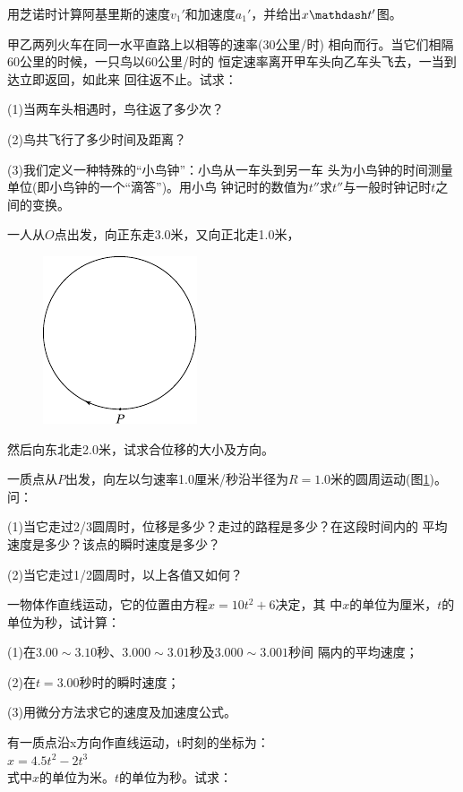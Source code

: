 \begin{exercises}

\exercise 用芝诺时计算阿基里斯的速度$v_1'$和加速度$a_1'$，并给出$x \mathdash t'$图。

\exercise 甲乙两列火车在同一水平直路上以相等的速率(30公里/时)
相向而行。当它们相隔60公里的时候，一只鸟以60公里/时的
恒定速率离开甲车头向乙车头飞去，一当到达立即返回，如此来
回往返不止。试求：

(1)当两车头相遇时，鸟往返了多少次？

(2)鸟共飞行了多少时间及距离？

(3)我们定义一种特殊的“小鸟钟”：小鸟从一车头到另一车
头为小鸟钟的时间测量单位(即小鸟钟的一个“滴答”)。用小鸟
钟记时的数值为$t''$求$t''$与一般时钟记时$t$之间的变换。

\exercise 一人从$O$点出发，向正东走3.0米，又向正北走1.0米，
\begin{figure}
    \begin{center}
        \includegraphics{figure/fig01.28}
        \caption{}
        \label{fig:01.28}
    \end{center}
\end{figure}
然后向东北走2.0米，试求合位移的大小及方向。

\exercise 一质点从$ P $出发，向左以匀速率1.0厘米/秒沿半径为$R=1.0$米的圆周运动(图\ref{fig:01.28})。问：

(1)当它走过2/3圆周时，位移是多少？走过的路程是多少？在这段时间内的
平均速度是多少？该点的瞬时速度是多少？

\clearpage
(2)当它走过1/2圆周时，以上各值又如何？

\exercise 一物体作直线运动，它的位置由方程$x=10t^2+6$决定，其
中$x$的单位为厘米，$t$的单位为秒，试计算：

(1)在$ 3.00\sim 3.10 $秒、$ 3.000\sim 3.01 $秒及$ 3.000\sim 3.001 $秒间
隔内的平均速度；

(2)在$t=3.00$秒时的瞬时速度；

(3)用微分方法求它的速度及加速度公式。

\exercise 有一质点沿x方向作直线运动，t时刻的坐标为：\\
\null\qquad\qquad \qquad $x=4.5t^2-2t^3$\\
式中$x$的单位为米。$t$的单位为秒。试求：


\end{exercises}

